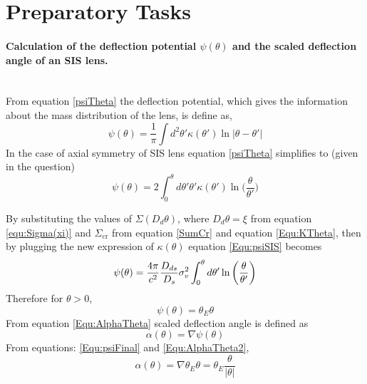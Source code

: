 \section{Preparatory Tasks}
\paragraph{Calculation of the deflection potential $\psi(\theta) $ and the scaled deflection angle of an SIS lens.}\hspace{0pt}\\
 From equation \ref{psiTheta} the deflection potential, which gives the information about the mass distribution of the lens, is define as,
 \begin{equation}
 \psi(\theta)=\frac{1}{\pi}\int d^2\theta'\kappa(\theta')\ln |\theta-\theta'| 
 \end{equation}
 In the case of axial symmetry of SIS lens equation \ref{psiTheta} simplifies to (given in the question)
 \begin{equation}
 \psi(\theta)=2\int_{0}^{\theta}d\theta' \theta'\kappa(\theta') \ln \bigg(\frac{\theta}{\theta'}\bigg)
 \label{Equ:psiSIS}
 \end{equation}

 By substituting the values of $ \Sigma(D_{d}\theta) $, where $ D_{d}\theta=\xi $ from equation \ref{equ:Sigma(xi)} and  $ \Sigma_\text{cr} $ from equation \ref{SumCr} and equation \ref{Equ:KTheta}, then by plugging the new expression of  $ \kappa(\theta) $ equation \ref{Equ:psiSIS} becomes
 \begin{equation*}
	 \psi(\theta) =\frac{4\pi}{c^2}\frac{D_{ds}}{D_{s}}\sigma^2_{v}\int_{0}^{\theta}d\theta' \ln \bigg(\frac{\theta}{\theta'}\bigg) \\
 \end{equation*}
 Therefore for $\theta > 0$, 
 \begin{equation}
 \psi(\theta)=\theta_{E}\theta 
 \label{Equ:psiFinal}
 \end{equation}
 From equation \ref{Equ:AlphaTheta} scaled deflection angle is defined as
 \begin{equation*}
 \alpha(\theta)=\nabla\psi(\theta)
 \label{Equ:AlphaTheta2}
 \end{equation*}
 From equations: \ref{Equ:psiFinal} and \ref{Equ:AlphaTheta2},
 \begin{equation}
 \alpha(\theta)=\nabla \theta_{E}\theta = \theta_{E} \frac{\theta}{|\theta|}
 \label{Equ:AlphaThetaFinal}
 \end{equation}
 
